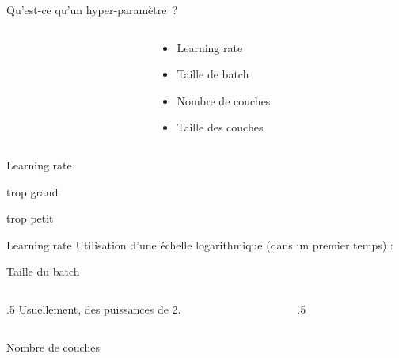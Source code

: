\begin{frame}{Qu'est-ce qu'un hyper-paramètre~?}
  \begin{columns}
    \begin{column}[c]{0.5\textwidth}
    \end{column}
    \begin{column}[c]{0.5\textwidth}
      \begin{itemize}
        \item Learning rate
        \item Taille de batch
        \item Nombre de couches
        \item Taille des couches
      \end{itemize}
    \end{column}
  \end{columns}
\end{frame}

\begin{frame}{Learning rate}
  \begin{minipage}{0.49\textwidth}
    \centering
    trop grand
  \end{minipage}\hfill
  \begin{minipage}{0.49\linewidth}
    \centering
    trop petit
  \end{minipage}\hfill

\end{frame}

\begin{frame}{Learning rate}
  Utilisation d'une échelle logarithmique (dans un premier temps) :
\end{frame}

\begin{frame}{Taille du batch}
  \begin{columns}
    \begin{column}{.5\tw}
      Usuellement, des puissances de 2.
    \end{column}
    \begin{column}{.5\tw}
    \end{column}
  \end{columns}
\end{frame}

\begin{frame}{Nombre de couches}
\end{frame}

